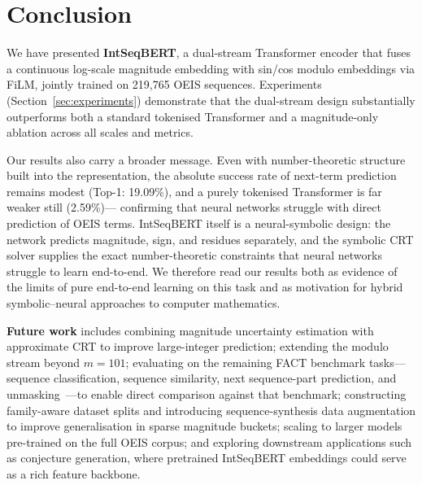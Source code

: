 
\section{Conclusion}
\label{sec:conclusion}

We have presented \textbf{IntSeqBERT}, a dual-stream Transformer encoder that fuses a
continuous log-scale magnitude embedding with sin/cos modulo embeddings via FiLM, jointly
trained on 219,765 OEIS sequences. Experiments (Section~\ref{sec:experiments}) demonstrate
that the dual-stream design substantially outperforms both a standard tokenised Transformer
and a magnitude-only ablation across all scales and metrics.

Our results also carry a broader message. Even with number-theoretic structure built into
the representation, the absolute success rate of next-term prediction remains modest
(Top-1: 19.09\%), and a purely tokenised Transformer is far weaker still (2.59\%)---
confirming that neural networks struggle with direct prediction of OEIS terms.
IntSeqBERT itself is a neural-symbolic design: the network predicts magnitude, sign, and
residues separately, and the symbolic CRT solver supplies the exact number-theoretic
constraints that neural networks struggle to learn end-to-end. We therefore read our
results both as evidence of the limits of pure end-to-end learning on this task and as
motivation for hybrid symbolic--neural approaches to computer mathematics.

\textbf{Future work} includes combining magnitude uncertainty estimation with approximate CRT
to improve large-integer prediction; extending the modulo stream beyond $m = 101$;
evaluating on the remaining FACT benchmark tasks---sequence classification, sequence
similarity, next sequence-part prediction, and unmasking~\cite{zurich-fact}---to enable direct
comparison against that benchmark;
constructing family-aware dataset splits and introducing sequence-synthesis data
augmentation to improve generalisation in sparse magnitude buckets;
scaling to larger models pre-trained on the full OEIS corpus;
and exploring downstream applications such as conjecture generation,
where pretrained IntSeqBERT embeddings could serve as a rich feature backbone.
